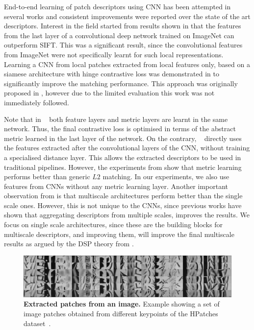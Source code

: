 End-to-end learning of patch descriptors using CNN has been attempted
in several works
\cite{FDB14,ZagoruykoCVPR2015,simo2015deepdesc,Han_2015_CVPR} and
consistent improvements were reported over the state of the art
descriptors.  Interest in the field started from results shown in
\cite{FDB14} that the features from the last layer of a convolutional
deep network trained on ImageNet \cite{ILSVRC15} can outperform
SIFT. This was a significant result, since the convolutional features
from ImageNet were not specifically learnt for such local
representations. Learning a CNN from local patches extracted from
local features only, based on a siamese architecture with hinge
contrastive loss \cite{1640964} was demonstrated in
\cite{ZagoruykoCVPR2015,simo2015deepdesc,Han_2015_CVPR} to significantly
 improve the matching performance. This approach was originally proposed in \cite{Jahrer}, however due to the limited evaluation this work was
not immediately followed.

Note that in ~\cite{ZagoruykoCVPR2015,Han_2015_CVPR} both feature
layers and metric layers are learnt in the same network. Thus, the
final contrastive loss is optimised in terms of the abstract metric
learned in the last layer of the network. On the contrary,
~\cite{simo2015deepdesc} directly uses the features extracted after
the convolutional layers of the CNN, without training a specialised
distance layer. This allows the extracted descriptors to be used in
traditional pipelines. However, the experiments from
\cite{ZagoruykoCVPR2015} show that metric learning performs better
than generic $L2$ matching. In our experiments, we also use features
from CNNs without any metric learning layer. Another important observation from \cite{ZagoruykoCVPR2015} is that
multiscale architectures perform better than the single scale ones. However,
this is not unique to the CNNs, since previous works have
shown that aggregating descriptors from multiple scales, improves the
results.  We focus on single scale architectures,
since these are the building blocks for multiscale descriptors, and
improving them, will improve the final multiscale results as argued
by the DSP theory from \cite{DBLP:journals/corr/DongS14}.

\begin{figure}
    \centering
    \includegraphics[width=\textwidth]{main/chapter02/images/patches_hard.png}
    \caption[Extracted patches from an image]{\textbf{Extracted patches from an image.} Example showing a set of image patches obtained from different keypoints of the HPatches dataset~\cite{HPatches}.}
\label{tfeat_fig:patches}
\end{figure}

